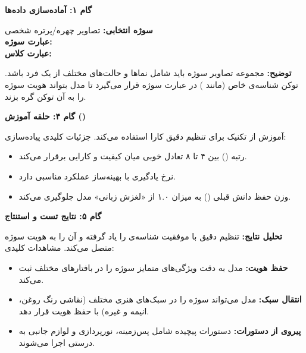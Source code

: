 \textbf{گام ۱: آماده‌سازی داده‌ها}
\begin{solutionbox}
    \textbf{سوژه انتخابی:} تصاویر چهره/پرتره شخصی \\
    \textbf{عبارت سوژه:}  \\
    \textbf{عبارت کلاس:} 

    \textbf{توضیح:} مجموعه تصاویر سوژه باید شامل نماها و حالت‌های مختلف از یک فرد باشد. توکن شناسه‌ی خاص (مانند ) در عبارت سوژه قرار می‌گیرد تا مدل بتواند هویت سوژه را به آن توکن گره بزند.
\end{solutionbox}

\textbf{گام ۴: حلقه آموزش ()}
\begin{solutionbox}
    آموزش  از تکنیک  برای تنظیم دقیق کارا استفاده می‌کند. جزئیات کلیدی پیاده‌سازی:
    


    \begin{itemize}
        \item رتبه () بین ۴ تا ۸ تعادل خوبی میان کیفیت و کارایی برقرار می‌کند.
        \item نرخ یادگیری  با بهینه‌ساز  عملکرد مناسبی دارد.
        \item وزن حفظ دانش قبلی () به میزان ۱.۰ از «لغزش زبانی» مدل جلوگیری می‌کند.
    \end{itemize}
\end{solutionbox}

\textbf{گام ۵: نتایج تست و استنتاج}
\begin{solutionbox}
    \textbf{تحلیل نتایج:}
    تنظیم دقیق  با موفقیت شناسه‌ی  را یاد گرفته و آن را به هویت سوژه متصل می‌کند. مشاهدات کلیدی:
    \begin{itemize}
        \item \textbf{حفظ هویت:} مدل به دقت ویژگی‌های متمایز سوژه را در بافتارهای مختلف ثبت می‌کند.
        \item \textbf{انتقال سبک:} مدل می‌تواند سوژه را در سبک‌های هنری مختلف (نقاشی رنگ روغن، انیمه و غیره) با حفظ هویت قرار دهد.
        \item \textbf{پیروی از دستورات:} دستورات پیچیده شامل پس‌زمینه، نورپردازی و لوازم جانبی به درستی اجرا می‌شوند.
    \end{itemize}
\end{solutionbox}


